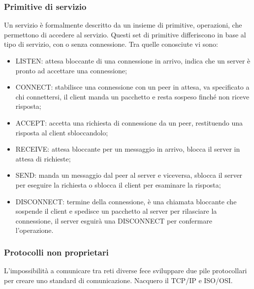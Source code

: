 \documentclass{subfiles}
\begin{document}
\subsubsection{Primitive di servizio}
    Un servizio è formalmente descritto da un insieme di primitive, operazioni, che permettono di accedere al servizio. Questi set di 
    primitive differiscono in base al tipo di servizio, con o senza connessione.
    Tra quelle conosciute vi sono:
    \begin{itemize}
        \item LISTEN: attesa bloccante di una connessione in arrivo, indica che un server è pronto ad accettare una connessione;
        \item CONNECT: stabilisce una connessione con un peer in attesa, va specificato a chi connettersi, il client manda un pacchetto 
        e resta sospeso finché non riceve risposta;
        \item ACCEPT: accetta una richiesta di connessione da un peer, restituendo una risposta al client sbloccandolo;
        \item RECEIVE: attesa bloccante per un messaggio in arrivo, blocca il server in attesa di richieste;
        \item SEND: manda un messaggio dal peer al server e viceversa, sblocca il server per eseguire la richiesta o sblocca il client 
        per esaminare la risposta;
        \item DISCONNECT: termine della connessione, è una chiamata bloccante che sospende il client e spedisce un pacchetto al server 
        per rilasciare la connessione, il server esguirà una DISCONNECT per confermare l'operazione.
    \end{itemize}
    
\subsubsection{Protocolli non proprietari}
    L'impossibilità a comunicare tra reti diverse fece sviluppare due pile protocollari per creare uno standard di comunicazione. 
    Nacquero il TCP/IP e ISO/OSI.
\end{document}
